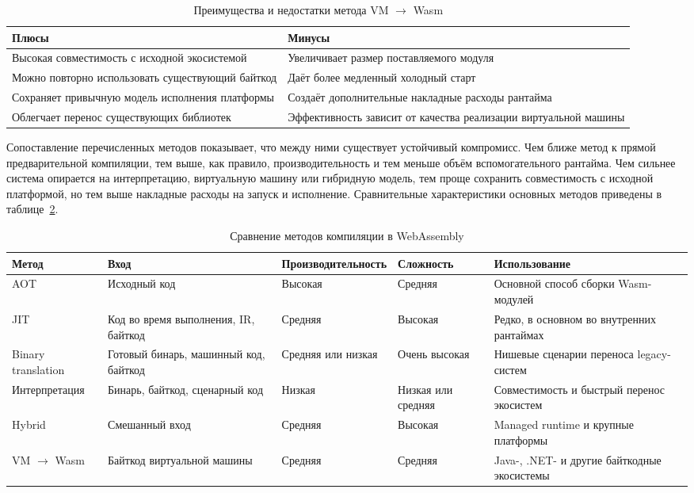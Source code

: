 \documentclass[12pt, oneside]{book}
\begin{document}
\begin{table}[htbp]
\centering
\scriptsize
\renewcommand{\arraystretch}{1.15}
\begin{tabular}{|p{5.8cm}|p{5.8cm}|}
\hline
\textbf{Плюсы} & \textbf{Минусы} \\
\hline
Высокая совместимость с исходной экосистемой & Увеличивает размер поставляемого модуля \\
\hline
Можно повторно использовать существующий байткод & Даёт более медленный холодный старт \\
\hline
Сохраняет привычную модель исполнения платформы & Создаёт дополнительные накладные расходы рантайма \\
\hline
Облегчает перенос существующих библиотек & Эффективность зависит от качества реализации виртуальной машины \\
\hline
\end{tabular}
\caption{Преимущества и недостатки метода VM $\rightarrow$ Wasm}
\label{tab:vm_to_wasm_pros_cons}
\end{table}

    \quad Сопоставление перечисленных методов показывает, что между ними существует устойчивый компромисс. Чем ближе метод к прямой предварительной компиляции, тем выше, как правило, производительность и тем меньше объём вспомогательного рантайма. Чем сильнее система опирается на интерпретацию, виртуальную машину или гибридную модель, тем проще сохранить совместимость с исходной платформой, но тем выше накладные расходы на запуск и исполнение. Сравнительные характеристики основных методов приведены в таблице~\ref{tab:compilation_methods}.

\begin{table}[htbp]
\centering
\scriptsize
\renewcommand{\arraystretch}{1.2}
\begin{tabular}{|p{2.4cm}|p{2.0cm}|p{3.2cm}|p{2cm}|p{3.2cm}|}
\hline
\textbf{Метод} & \textbf{Вход} & \textbf{Производительность} & \textbf{Сложность} & \textbf{Использование} \\
\hline
AOT & Исходный код & Высокая & Средняя & Основной способ сборки Wasm-модулей \\
\hline
JIT & Код во время выполнения, IR, байткод & Средняя & Высокая & Редко, в основном во внутренних рантаймах \\
\hline
Binary translation & Готовый бинарь, машинный код, байткод & Средняя или низкая & Очень высокая & Нишевые сценарии переноса legacy-систем \\
\hline
Интерпретация & Бинарь, байткод, сценарный код & Низкая & Низкая или средняя & Совместимость и быстрый перенос экосистем \\
\hline
Hybrid & Смешанный вход & Средняя & Высокая & Managed runtime и крупные платформы \\
\hline
VM $\rightarrow$ Wasm & Байткод виртуальной машины & Средняя & Средняя & Java-, .NET- и другие байткодные экосистемы \\
\hline
\end{tabular}
\caption{Сравнение методов компиляции в WebAssembly}
\label{tab:compilation_methods}
\end{table}
\end{document}
